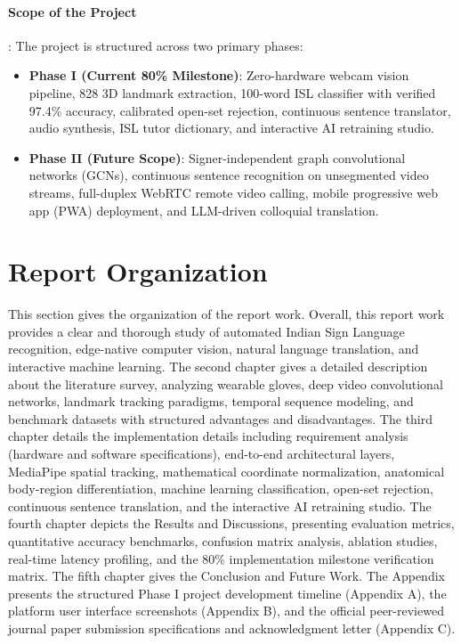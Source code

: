 \paragraph{Scope of the Project}:
The project is structured across two primary phases:
\begin{itemize}
    \setlength{\itemsep}{0pt}
    \setlength{\parskip}{0pt}
    \item \textbf{Phase I (Current 80\% Milestone)}: Zero-hardware webcam vision pipeline, 828 3D landmark extraction, 100-word ISL classifier with verified 97.4\% accuracy, calibrated open-set rejection, continuous sentence translator, audio synthesis, ISL tutor dictionary, and interactive AI retraining studio.
    \item \textbf{Phase II (Future Scope)}: Signer-independent graph convolutional networks (GCNs), continuous sentence recognition on unsegmented video streams, full-duplex WebRTC remote video calling, mobile progressive web app (PWA) deployment, and LLM-driven colloquial translation.
\end{itemize}

\section{Report Organization}

This section gives the organization of the report work. Overall, this report work provides a clear and thorough study of automated Indian Sign Language recognition, edge-native computer vision, natural language translation, and interactive machine learning. The second chapter gives a detailed description about the literature survey, analyzing wearable gloves, deep video convolutional networks, landmark tracking paradigms, temporal sequence modeling, and benchmark datasets with structured advantages and disadvantages. The third chapter details the implementation details including requirement analysis (hardware and software specifications), end-to-end architectural layers, MediaPipe spatial tracking, mathematical coordinate normalization, anatomical body-region differentiation, machine learning classification, open-set rejection, continuous sentence translation, and the interactive AI retraining studio. The fourth chapter depicts the Results and Discussions, presenting evaluation metrics, quantitative accuracy benchmarks, confusion matrix analysis, ablation studies, real-time latency profiling, and the 80\% implementation milestone verification matrix. The fifth chapter gives the Conclusion and Future Work. The Appendix presents the structured Phase I project development timeline (Appendix A), the platform user interface screenshots (Appendix B), and the official peer-reviewed journal paper submission specifications and acknowledgment letter (Appendix C).

